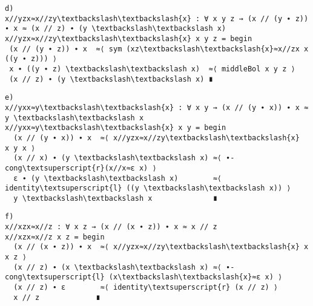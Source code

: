 \begin{Verbatim}[commandchars=\\\{\},samepage=true]
d)
x//yzx≈x//zy\textbackslash\textbackslash{x} : ∀ x y z → (x // (y ∙ z)) ∙ x ≈ (x // z) ∙ (y \textbackslash\textbackslash x)
x//yzx≈x//zy\textbackslash\textbackslash{x} x y z = begin
 (x // (y ∙ z)) ∙ x  ≈⟨ sym (xz\textbackslash\textbackslash{x}≈x//zx x ((y ∙ z))) ⟩
 x ∙ ((y ∙ z) \textbackslash\textbackslash x)  ≈⟨ middleBol x y z ⟩
 (x // z) ∙ (y \textbackslash\textbackslash x) ∎
\end{Verbatim}

\begin{Verbatim}[commandchars=\\\{\},samepage=true]
e)
x//yxx≈y\textbackslash\textbackslash{x} : ∀ x y → (x // (y ∙ x)) ∙ x ≈ y \textbackslash\textbackslash x
x//yxx≈y\textbackslash\textbackslash{x} x y = begin
  (x // (y ∙ x)) ∙ x  ≈⟨ x//yzx≈x//zy\textbackslash\textbackslash{x}  x y x ⟩
  (x // x) ∙ (y \textbackslash\textbackslash x) ≈⟨ ∙-cong\textsuperscript{r}(x//x≈ε x) ⟩
  ε ∙ (y \textbackslash\textbackslash x)        ≈⟨ identity\textsuperscript{l} ((y \textbackslash\textbackslash x)) ⟩
  y \textbackslash\textbackslash x              ∎
\end{Verbatim}

\begin{Verbatim}[commandchars=\\\{\},samepage=true]
f)
x//xzx≈x//z : ∀ x z → (x // (x ∙ z)) ∙ x ≈ x // z
x//xzx≈x//z x z = begin
  (x // (x ∙ z)) ∙ x  ≈⟨ x//yzx≈x//zy\textbackslash\textbackslash{x} x x z ⟩
  (x // z) ∙ (x \textbackslash\textbackslash x) ≈⟨ ∙-cong\textsuperscript{l} (x\textbackslash\textbackslash{x}≈ε x) ⟩
  (x // z) ∙ ε        ≈⟨ identity\textsuperscript{r} (x // z) ⟩
  x // z             ∎     
\end{Verbatim}

